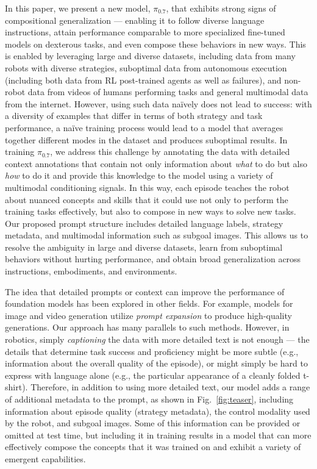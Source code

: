 \documentclass[conference]{IEEEtran}
\def \MethodName {$\pi_{0.7}$}
\begin{document}
In this paper, we present a new model, \MethodName{}, that exhibits strong signs of compositional generalization --- enabling it to follow diverse language instructions, attain performance comparable to more specialized fine-tuned models on dexterous tasks, and even compose these behaviors in new ways. This is enabled by leveraging large and diverse datasets, including data from many robots with diverse strategies, suboptimal data from autonomous execution (including both data from RL post-trained agents as well as failures), and non-robot data from videos of humans performing tasks and general multimodal data from the internet. However, using such data na\"{i}vely does not lead to success: with a diversity of examples that differ in terms of both strategy and task performance, a na\"{i}ve training process would lead to a model that averages together different modes in the dataset and produces suboptimal results. In training \MethodName{}, we address this challenge by annotating the data with detailed context annotations that contain not only information about \emph{what} to do but also \emph{how} to do it and provide this knowledge to the model using a variety of multimodal conditioning signals. In this way, each episode teaches the robot about nuanced concepts and skills that it could use not only to perform the training tasks effectively, but also to compose in new ways to solve new tasks. Our proposed prompt structure includes detailed language labels, strategy metadata, and multimodal information such as subgoal images. This allows us to resolve the ambiguity in large and diverse datasets, learn from suboptimal behaviors without hurting performance, and obtain broad generalization across instructions, embodiments, and environments.

The idea that detailed prompts or context can improve the performance of foundation models has been explored in other fields. For example, models for image and video generation utilize \emph{prompt expansion} to produce high-quality generations. Our approach has many parallels to such methods. However, in robotics, simply \emph{captioning} the data with more detailed text is not enough --- the details that determine task success and proficiency might be more subtle (e.g., information about the overall quality of the episode), or might simply be hard to express with language alone (e.g., the particular appearance of a cleanly folded t-shirt). Therefore, in addition to using more detailed text, our model adds a range of additional metadata to the prompt, as shown in Fig.~\ref{fig:teaser}, including information about episode quality (strategy metadata), the control modality used by the robot, and subgoal images. Some of this information can be provided or omitted at test time, but including it in training results in a model that can more effectively compose the concepts that it was trained on and exhibit a variety of emergent capabilities.
\end{document}
